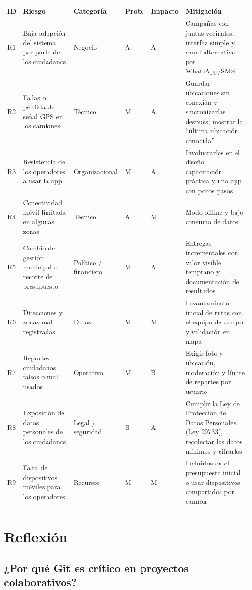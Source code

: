 \documentclass[11pt,a4paper]{article}
\begin{document}
{\small
\begin{longtable}{C{0.8cm} L{3.6cm} L{2.2cm} C{0.9cm} C{1.3cm} L{5.6cm}}
\toprule
\textbf{ID} & \textbf{Riesgo} & \textbf{Categoría} & \textbf{Prob.} & \textbf{Impacto} & \textbf{Mitigación} \\
\midrule
\endhead
R1 & Baja adopción del sistema por parte de los ciudadanos & Negocio & A & A & Campañas con juntas vecinales, interfaz simple y canal alternativo por WhatsApp/SMS \\
R2 & Fallas o pérdida de señal GPS en los camiones & Técnico & M & A & Guardar ubicaciones sin conexión y sincronizarlas después; mostrar la ``última ubicación conocida'' \\
R3 & Resistencia de los operadores a usar la app & Organizacional & M & A & Involucrarlos en el diseño, capacitación práctica y una app con pocos pasos \\
R4 & Conectividad móvil limitada en algunas zonas & Técnico & A & M & Modo offline y bajo consumo de datos \\
R5 & Cambio de gestión municipal o recorte de presupuesto & Político / financiero & M & A & Entregas incrementales con valor visible temprano y documentación de resultados \\
R6 & Direcciones y zonas mal registradas & Datos & M & M & Levantamiento inicial de rutas con el equipo de campo y validación en mapa \\
R7 & Reportes ciudadanos falsos o mal usados & Operativo & M & B & Exigir foto y ubicación, moderación y límite de reportes por usuario \\
R8 & Exposición de datos personales de los ciudadanos & Legal / seguridad & B & A & Cumplir la Ley de Protección de Datos Personales (Ley 29733), recolectar los datos mínimos y cifrarlos \\
R9 & Falta de dispositivos móviles para los operadores & Recursos & M & M & Incluirlos en el presupuesto inicial o usar dispositivos compartidos por camión \\
\bottomrule
\end{longtable}
}

\section{Reflexión}

\subsection*{¿Por qué Git es crítico en proyectos colaborativos?}
\end{document}
